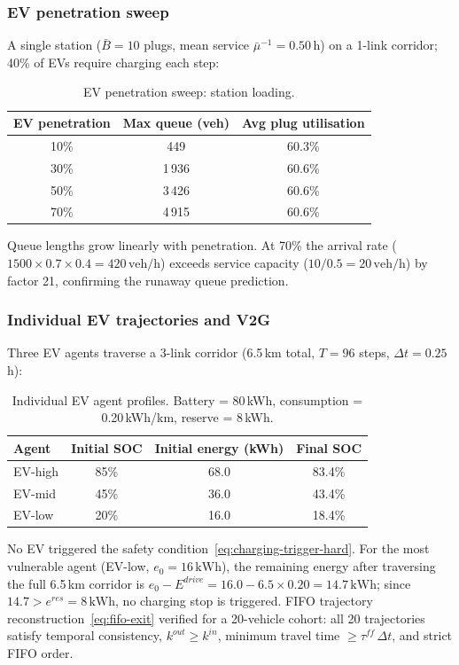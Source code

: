 \subsubsection{EV penetration sweep}

A single station ($\bar{B}=10$ plugs, mean service $\bar{\mu}^{-1}=0.50\,$h)
on a 1-link corridor; 40\% of EVs require charging each step:
\begin{table}[htbp]
\centering
\caption{EV penetration sweep: station loading.}
\label{tab:ltm-ev-penetration}
\begin{tabular}{ccc}
\toprule
EV penetration & Max queue (veh) & Avg plug utilisation \\
\midrule
10\% &   449 & 60.3\% \\
30\% & 1\,936 & 60.6\% \\
50\% & 3\,426 & 60.6\% \\
70\% & 4\,915 & 60.6\% \\
\bottomrule
\end{tabular}
\end{table}
Queue lengths grow linearly with penetration.  At 70\% the arrival rate
($1500 \times 0.7 \times 0.4 = 420\,\text{veh/h}$) exceeds service
capacity ($10/0.5 = 20\,\text{veh/h}$) by factor 21, confirming the
runaway queue prediction.

\subsubsection{Individual EV trajectories and V2G}

Three EV agents traverse a 3-link corridor (6.5\,km total, $T=96$
steps, $\Delta t = 0.25\,$h):
\begin{table}[htbp]
\centering
\caption{Individual EV agent profiles.  Battery = 80\,kWh,
  consumption = 0.20\,kWh/km, reserve = 8\,kWh.}
\label{tab:ltm-ev-agents}
\begin{tabular}{lccc}
\toprule
Agent & Initial SOC & Initial energy (kWh) & Final SOC \\
\midrule
EV-high & 85\% & 68.0 & 83.4\% \\
EV-mid  & 45\% & 36.0 & 43.4\% \\
EV-low  & 20\% & 16.0 & 18.4\% \\
\bottomrule
\end{tabular}
\end{table}
No EV triggered the safety condition~\eqref{eq:charging-trigger-hard}.
For the most vulnerable agent (EV-low, $e_0 = 16\,\text{kWh}$), the
remaining energy after traversing the full 6.5\,km corridor is
$e_0 - E^{drive} = 16.0 - 6.5\times0.20 = 14.7\,\text{kWh}$;
since $14.7 > e^{res} = 8\,\text{kWh}$, no charging stop is triggered.
FIFO trajectory reconstruction~\eqref{eq:fifo-exit} verified for a
20-vehicle cohort: all 20 trajectories satisfy temporal consistency,
$k^{out} \ge k^{in}$, minimum travel time $\ge \tau^{ff}\,\Delta t$,
and strict FIFO order.

